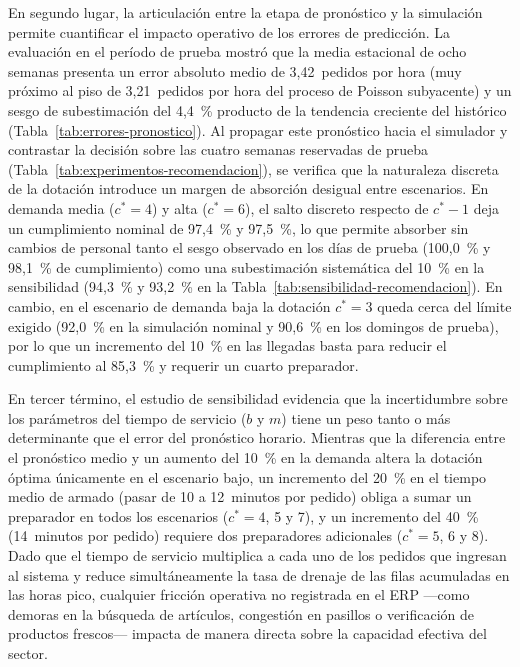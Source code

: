 En segundo lugar, la articulación entre la etapa de pronóstico y la simulación permite cuantificar el impacto operativo de los errores de predicción.
La evaluación en el período de prueba mostró que la media estacional de ocho semanas presenta un error absoluto medio de 3,42~pedidos por hora (muy próximo al piso de 3,21~pedidos por hora del proceso de Poisson subyacente) y un sesgo de subestimación del 4,4~\% producto de la tendencia creciente del histórico (Tabla~\ref{tab:errores-pronostico}).
Al propagar este pronóstico hacia el simulador y contrastar la decisión sobre las cuatro semanas reservadas de prueba (Tabla~\ref{tab:experimentos-recomendacion}), se verifica que la naturaleza discreta de la dotación introduce un margen de absorción desigual entre escenarios.
En demanda media ($c^* = 4$) y alta ($c^* = 6$), el salto discreto respecto de $c^* - 1$ deja un cumplimiento nominal de 97,4~\% y 97,5~\%, lo que permite absorber sin cambios de personal tanto el sesgo observado en los días de prueba (100,0~\% y 98,1~\% de cumplimiento) como una subestimación sistemática del 10~\% en la sensibilidad (94,3~\% y 93,2~\% en la Tabla~\ref{tab:sensibilidad-recomendacion}).
En cambio, en el escenario de demanda baja la dotación $c^* = 3$ queda cerca del límite exigido (92,0~\% en la simulación nominal y 90,6~\% en los domingos de prueba), por lo que un incremento del 10~\% en las llegadas basta para reducir el cumplimiento al 85,3~\% y requerir un cuarto preparador.

En tercer término, el estudio de sensibilidad evidencia que la incertidumbre sobre los parámetros del tiempo de servicio ($b$ y $m$) tiene un peso tanto o más determinante que el error del pronóstico horario.
Mientras que la diferencia entre el pronóstico medio y un aumento del 10~\% en la demanda altera la dotación óptima únicamente en el escenario bajo, un incremento del 20~\% en el tiempo medio de armado (pasar de 10 a 12~minutos por pedido) obliga a sumar un preparador en todos los escenarios ($c^* = 4$, 5 y 7), y un incremento del 40~\% (14~minutos por pedido) requiere dos preparadores adicionales ($c^* = 5$, 6 y 8).
Dado que el tiempo de servicio multiplica a cada uno de los pedidos que ingresan al sistema y reduce simultáneamente la tasa de drenaje de las filas acumuladas en las horas pico, cualquier fricción operativa no registrada en el ERP ---como demoras en la búsqueda de artículos, congestión en pasillos o verificación de productos frescos--- impacta de manera directa sobre la capacidad efectiva del sector.

